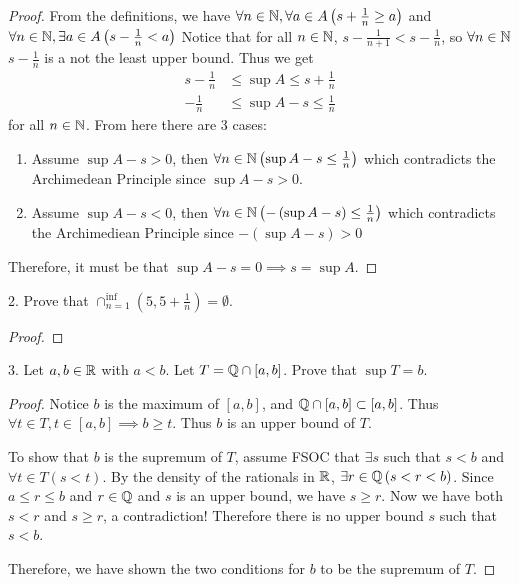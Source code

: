 
\begin{proof}
	From the definitions, we have $\forall n \in \mathbb{N}, \forall a \in A \left(s + \frac{1}{n} \ge a \right)$ and $\forall n \in \mathbb{N}, \exists a \in A\left( s - \frac{1}{n} < a \right) $ Notice that for all $n \in \mathbb{N}$, $s - \frac{1}{n + 1} < s - \frac{1}{n}$, so $\forall n \in \mathbb{N}$ $s - \frac{1}{n}$ is a not the least upper bound. Thus we get 
	\begin{align}
		s - \frac{1}{n} &\le \sup A \le s + \frac{1}{n} \\
		- \frac{1}{n}   &\le \sup A - s \le \frac{1}{n}
	\end{align} 
	for all $n \in \mathbb{N}$. From here there are 3 cases:
	\begin{enumerate}
		\item Assume $\sup A - s > 0$, then $\forall n \in \mathbb{N} \left( \sup A - s \le \frac{1}{n} \right) $ which contradicts the Archimedean Principle since $\sup A - s > 0$.
		\item Assume $\sup A - s < 0$, then $\forall n \in \mathbb{N} \left( -\left( \sup A - s \right)  \le \frac{1}{n} \right) $ which contradicts the Archimediean Principle since $-\left( \sup A - s \right) > 0 $
	\end{enumerate}

	Therefore, it must be that $\sup A - s = 0  \implies s = \sup A$.
\end{proof}



2. Prove that $\cap_{n=1}^{\inf}\left( 5, 5+\frac{1}{n} \right) = \emptyset$.

\begin{proof}
	
\end{proof}




3. Let $a, b \in \mathbb{R}$ with $a < b$. Let $T = \mathbb{Q} \cap [a, b]$. Prove that $\sup T = b$.

\begin{proof}
	Notice $b$ is the maximum of $[a, b]$, and $\mathbb{Q} \cap [a, b] \subset [a, b]$. Thus $\forall t \in T, t \in [a, b] \implies b \ge t$. Thus $b$ is an upper bound of $T$.

	To show that $b$ is the supremum of $T$, assume FSOC that $\exists s$ such that $s < b$ and $\forall t \in T \left(s < t \right)$. By the density of the rationals in $ \mathbb{R}$, $\exists r \in \mathbb{Q} \left( s < r < b \right)$. Since $a \le r \le b$ and $r \in \mathbb{Q}$ and $s$ is an upper bound, we have $s \ge r$. Now we have both $s < r$ and $s \ge r$, a contradiction! Therefore there is no upper bound $s$ such that $s < b$. 

	Therefore, we have shown the two conditions for $b$ to be the supremum of $T$. 
\end{proof}




